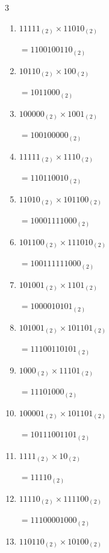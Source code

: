 \begin{multicols}{3}
\begin{enumerate}
        $=11000001111_{(2)}$

  \item $11111_{(2)} \times 11010_{(2)}$

        $=1100100110_{(2)}$

  \item $10110_{(2)} \times 100_{(2)}$

        $=1011000_{(2)}$

  \item $100000_{(2)} \times 1001_{(2)}$

        $=100100000_{(2)}$

  \item $11111_{(2)} \times 1110_{(2)}$

        $=110110010_{(2)}$

\columnbreak %

\resetques

  \item $11010_{(2)} \times 101100_{(2)}$

        $=10001111000_{(2)}$

  \item $101100_{(2)} \times 111010_{(2)}$

        $=100111111000_{(2)}$

  \item $101001_{(2)} \times 1101_{(2)}$

        $=1000010101_{(2)}$

  \item $101001_{(2)} \times 101101_{(2)}$

        $=11100110101_{(2)}$

  \item $1000_{(2)} \times 11101_{(2)}$

        $=11101000_{(2)}$

\columnbreak %

  \item $100001_{(2)} \times 101101_{(2)}$

        $=10111001101_{(2)}$

  \item $1111_{(2)} \times 10_{(2)}$

        $=11110_{(2)}$

  \item $11110_{(2)} \times 111100_{(2)}$

        $=11100001000_{(2)}$

  \item $110110_{(2)} \times 10100_{(2)}$


\end{enumerate}
\end{multicols}
